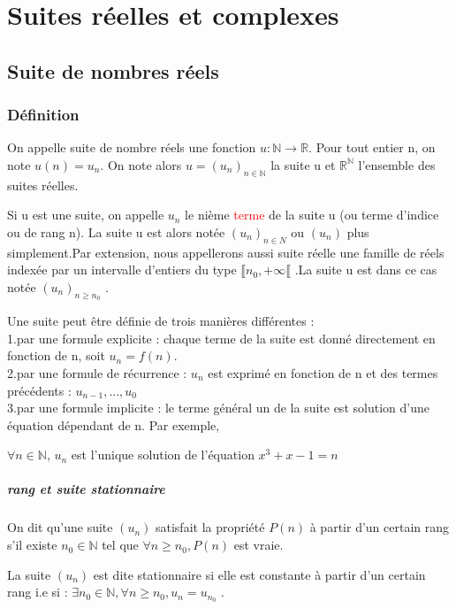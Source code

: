 \documentclass[12pt]{book}
\theoremstyle{definition}\newtheorem{dfn}{Définition}[chapter]
\theoremstyle{plain}\newtheorem{thm}{Théorème}[chapter]
\theoremstyle{plain}\newtheorem{prp}{Proposition}[chapter]
\theoremstyle{plain}\newtheorem{lem}{\bf Lemme}[chapter]
\theoremstyle{plain}\newtheorem{axm}{\bf Axiome}[chapter]
\theoremstyle{plain}\newtheorem{lmm}{\bf Lemme}[chapter]
\theoremstyle{plain}\newtheorem{cor}{\bf Corollaire}[chapter]
\theoremstyle{remark}\newtheorem{rem}{Remarque}[chapter]
\begin{document}
        \chapter{Suites réelles et complexes}
        \section{Suite de nombres réels}
        \subsection{Définition}
        On appelle suite de nombre réels une fonction $u:\mathbb{N}\to\mathbb{R}$. Pour tout entier n, on note $u(n) = u_n$.
        On note alors $u = (u_n)_{n\in\mathbb{N}}$ la suite u et $\mathbb{R}^\mathbb{N}$ l'ensemble des suites réelles.


        Si u est une suite, on appelle $u_n$ le nième \textcolor{red}{terme} de la suite u (ou terme d'indice ou de rang n). La suite u est alors notée $(u_n)_{n\in N}$ ou $(u_n)$ plus simplement.Par extension, nous appellerons aussi suite réelle une famille de réels indexée par un intervalle d'entiers
        du type $\llbracket n_0, + \infty \llbracket$ .La suite u est dans ce cas notée $(u_n)_{n\ge n_0}$ .

        Une suite peut être  déﬁnie de trois manières différentes :
        \\1.par une formule explicite : chaque terme de la suite est donné directement en fonction de n, soit $u_n = f(n)$.
        \\2.par une formule de récurrence : $u_n$ est exprimé en fonction de n et des termes précédents : $u_{n−1}, ... ,u_0$
        \\3.par une formule implicite : le terme général un de la suite est solution d’une équation dépendant de n. Par exemple,

        $\forall n \in \mathbb{N}$, $u_n$ est l'unique solution de l'équation $x^3+x-1=n$


        \paragraph{rang et suite stationnaire}
        On dit qu'une suite $(u_n)$ satisfait la propriété $P(n)$ à partir d'un certain rang s'il existe $n_0 \in \mathbb{N}$ tel que
        $\forall n \ge n_0, P(n)$ est vraie.

        La suite $(u_n)$ est dite stationnaire si elle est constante à partir d’un certain rang i.e si :
        $\exists n_0 \in \mathbb{N}, \forall n \ge n_0, u_n = u_{n_0}$ .
\end{document}
